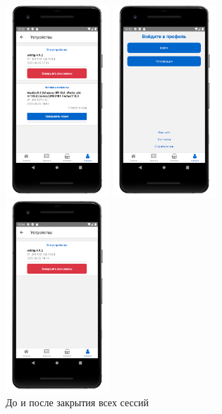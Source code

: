 \begin{figure}[!htb]\centering
    \begin{minipage}{0.19\textwidth}
        \centering

        \includegraphics[height=7.2cm]
        {images/mobile/sessions/sessions_close_one.png}
    \end{minipage}
    \begin{minipage}{0.19\textwidth}
        \centering

        \includegraphics[height=7.2cm]
        {images/mobile/sessions/sessions_close_all.png}
    \end{minipage}
    \begin{minipage}{0.19\textwidth}
        \centering

        \includegraphics[height=7.2cm]
        {images/mobile/sessions/sessions_after_close_all.png}
    \end{minipage}

    \caption{До и после закрытия всех сессий}
    \label{fig:test_sessions_close_all}
\end{figure}

